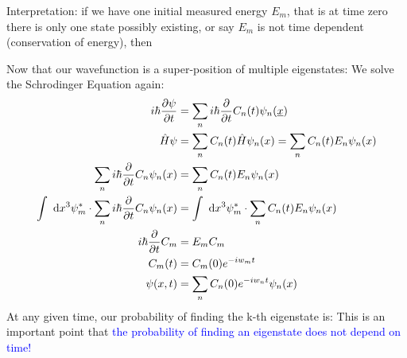 \documentclass{school-22.101-notes}
\begin{document}
Interpretation: if we have one initial measured energy $E_m$, that is at time zero there is only one state possibly existing, or say $E_m$ is not time dependent (conservation of energy), then 


Now that our wavefunction is a super-position of multiple eigenstates:
We solve the Schrodinger Equation again:
\begin{align}
i \hbar \frac{\partial \psi}{\partial t} &= \displaystyle\sum_n i \hbar \frac{\partial}{\partial t} C_n (t) \psi_n (\underline{x}) \\
\hat{H} \psi &= \displaystyle\sum_n C_n (t) \hat{H} \psi_n (x) = \displaystyle\sum_n C_n (t) E_n \psi_n (x) \\
\displaystyle\sum_n i \hbar \frac{\partial}{\partial t} C_n \psi_n (x) &= \displaystyle\sum_n C_n(t) E_n \psi_n(x) \\
\int \mbox{ }\mathrm{d} x^3 \psi_m^* \cdot \displaystyle\sum_n i \hbar \frac{\partial}{\partial t} C_n \psi_n (x) &= \int \mbox{ }\mathrm{d} x^3 \psi_m^* \cdot\displaystyle\sum_n C_n(t) E_n \psi_n(x) \\
i \hbar \frac{\partial}{\partial t} C_m &= E_m C_m \\
C_m (t) &= C_m (0) e^{-iw_m t} \\
\psi(x,t) &= \displaystyle\sum_n C_n (0) e^{-i w_n t} \psi_n (x) 
\end{align}
At any given time, our probability of finding the k-th eigenstate is:
This is an important point that \textcolor{blue}{the probability of finding an eigenstate does not depend on time!}
\end{document}
